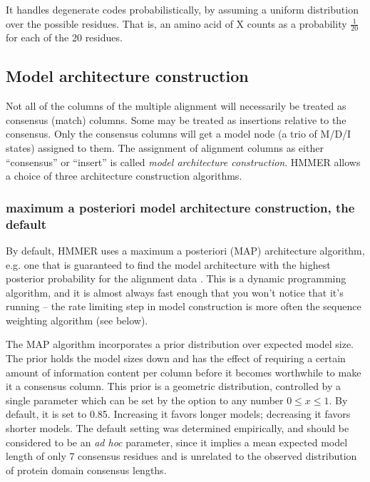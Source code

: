 It handles degenerate codes probabilistically, by assuming a uniform
distribution over the possible residues. That is, an amino acid of X
counts as a probability $\frac{1}{20}$ for each of the 20 residues.


\subsection{Model architecture construction}

Not all of the columns of the multiple alignment will necessarily be
treated as consensus (match) columns. Some may be treated as
insertions relative to the consensus. Only the consensus columns will
get a model node (a trio of M/D/I states) assigned to them.  The
assignment of alignment columns as either ``consensus'' or ``insert''
is called \emph{model architecture construction}. HMMER allows
a choice of three architecture construction algorithms.

\subsubsection{maximum a posteriori model architecture construction, the default}

By default, HMMER uses a maximum a posteriori (MAP) architecture
algorithm, e.g. one that is guaranteed to find the model architecture
with the highest posterior probability for the alignment data
\citep{Durbin98}.  This is a dynamic programming algorithm, and it is
almost always fast enough that you won't notice that it's running --
the rate limiting step in model construction is more often the
sequence weighting algorithm (see below). 

The MAP algorithm incorporates a prior distribution over expected
model size. The prior holds the model sizes down and has the effect of
requiring a certain amount of information content per column before it
becomes worthwhile to make it a consensus column. This prior is a
geometric distribution, controlled by a single parameter which can be
set by the  option to any number $0 \leq x \leq
1$. By default, it is set to 0.85. Increasing it favors longer models;
decreasing it favors shorter models. The default setting was
determined empirically, and should be considered to be an \emph{ad
hoc} parameter, since it implies a mean expected model length of only
7 consensus residues and is unrelated to the observed distribution of
protein domain consensus lengths.

